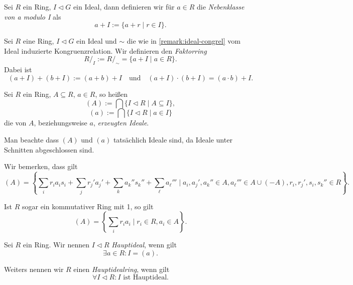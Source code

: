 \begin{definition}
    Sei $R$ ein Ring, $I \vartriangleleft G$ ein Ideal, dann definieren wir für $a \in R$ die \emph{Nebenklasse von a modulo I} als 
    $$a+I := \{ a + r \mid r \in I \}.$$
\end{definition}

\begin{definition}
    Sei $R$ eine Ring, $I \vartriangleleft G$ ein Ideal und $\sim$ die wie in \cref{remark:ideal-congrel} vom Ideal induzierte Kongruenzrelation. Wir definieren den \emph{Faktorring} 
    $$ R/_I := R/_\sim = \{ a + I \mid a \in R\}.$$
    Dabei ist
    $$ (a + I) + (b + I) := (a + b) + I \quad\text{und}\quad (a + I)\cdot(b+I) = (a\cdot b) + I. $$
\end{definition}

\begin{definition}
    Sei $R$ ein Ring, $A \subseteq R$, $a \in R$, so heißen
    $$ (A) := \bigcap \{ I \vartriangleleft R \mid A \subseteq I \}, $$
    $$ (a) := \bigcap \{ I \vartriangleleft R \mid a \in I \} $$
    die von $A$, beziehungsweise $a$, \emph{erzeugten Ideale}.
\end{definition}

\begin{remark}
    Man beachte dass $(A)$ und $(a)$ tatsächlich Ideale sind, da Ideale unter Schnitten abgeschlossen sind.
\end{remark}

\begin{remark}
    Wir bemerken, dass gilt
    $$ (A) = \left\{ \sum_i r_i a_i s_i + \sum_j r_j' a_j' + \sum_k a_k'' s_k'' + \sum_\ell a_\ell''' \mid a_i, a_j', a_k'' \in A, a_\ell''' \in A \cup (-A), r_i, r_j', s_i, s_k'' \in R \right\}. $$

    Ist $R$ sogar ein kommutativer Ring mit 1, so gilt
    $$ (A) = \left\{ \sum_i r_i a_i \mid r_i \in R, a_i \in A \right\}. $$
\end{remark}

\begin{definition}
    Sei $R$ ein Ring. Wir nennen $I \vartriangleleft R$ \emph{Hauptideal}, wenn gilt
    $$ \exists a \in R: I = (a). $$

    Weiters nennen wir $R$ einen \emph{Hauptidealring}, wenn gilt
    $$ \forall I \vartriangleleft R : I \text{ ist Hauptideal}. $$
\end{definition}

